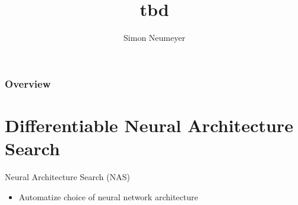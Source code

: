 \documentclass[]{beamer}
\title{tbd}
\author{Simon Neumeyer}
\date{}
\begin{document}
  {
  }
  
\begin{frame}
\frametitle{Overview}
\tableofcontents
\end{frame}

\section{Differentiable Neural Architecture Search}
\begin{frame}{Neural Architecture Search (NAS)}
\begin{itemize}
\setlength{\itemsep}{10pt}
\item Automatize choice of neural network architecture
\end{itemize}
\vspace{25pt}
\begin{figure}
\end{figure}
\end{frame}
\end{document}
